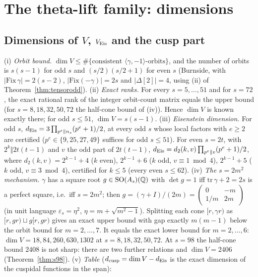 \section{The theta-lift family: dimensions}\label{sec:dimsec}
\subsection{Dimensions of $V$, $V_{\rm Eis}$ and the cusp part}
\begin{theorem}[Dimensions]\label{thm:dims}
(i) \emph{Orbit bound.} $\dim V\le\#\{\text{consistent }\langle\gamma,-1\rangle\text{-orbits}\}$, and the number of orbits is $s(s-1)$ for odd $s$ and
$(s/2)(s/2+1)$ for even $s$ (Burnside, with $|\mathrm{Fix}\,\gamma|=2(s-2)$, $|\mathrm{Fix}(-\gamma)|=2s$ and $|\Delta[2]|=4$, using (ii) of Theorem~\ref{thm:tensorodd}).
(ii) \emph{Exact ranks.} For every $s=5,\dots,51$ and for $s=72$, the exact rational rank of the integer orbit-count matrix equals the upper bound
(for $s=8,18,32,50,72$ the half-cone bound of (iv)). Hence $\dim V$ is known exactly there; for odd $s\le51$, $\dim V=s(s-1)$.
(iii) \emph{Eisenstein dimension.} For odd $s$, $d_{\rm Eis}=3\prod_{p^e\Vert n_s}(p^e+1)/2$, at every odd $s$ whose local factors with $e\ge2$ are certified
($p^e\in\{9,25,27,49\}$ suffices for odd $s\le51$). For even $s=2t$, with $2^k\Vert2t(t-1)$ and $v$ the odd part of $2t(t-1)$,
$d_{\rm Eis}=d_2(k,v)\prod_{p^e\Vert v}(p^e+1)/2$, where $d_2(k,v)=2^{k-1}+4$ ($k$ even), $2^{k-1}+6$ ($k$ odd, $v\equiv1\bmod4$), $2^{k-1}+5$ ($k$ odd,
$v\equiv3\bmod4$), certified for $k\le5$ (every even $s\le62$).
(iv) \emph{The $s=2m^2$ mechanism.} $\gamma$ has a square root $g\in\mathrm{SO}(A_s)(\mathbb{Q})$ with $\det g=1$ iff $\mathrm{tr}\,\gamma+2=2s$ is a perfect square, i.e.\ iff
$s=2m^2$; then $g=(\gamma+I)/(2m)=\begin{pmatrix}0&-m\\1/m&2m\end{pmatrix}$ (in unit language $\varepsilon_s=\eta^2$, $\eta=m+\sqrt{m^2-1}$). Splitting each cone
$[r,\gamma r)$ as $[r,gr)\sqcup g[r,gr)$ gives an exact upper bound with gap exactly $m(m-1)$ below the orbit bound for $m=2,\dots,7$. It equals the exact lower
bound for $m=2,\dots,6$: $\dim V=18,84,260,630,1302$ at $s=8,18,32,50,72$. At $s=98$ the half-cone bound $2408$ is not sharp: there are two further relations and $\dim V=2406$ (Theorem~\ref{thm:s98}).
(v) \emph{Table} ($d_{\rm cusp}=\dim V-d_{\rm Eis}$ is the exact dimension of the cuspidal functions in the span):

\end{theorem}
